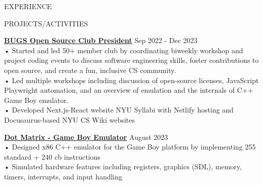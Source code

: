 \documentclass{resume} %
\begin{document}
\begin{rSection}{EXPERIENCE}
\end{rSection} 


\begin{rSection}{PROJECTS/ACTIVITIES}

\textbf{\href{https://bugs-nyu.github.io/}{BUGS Open Source Club President}} \hfill Sep 2022 - Dec 2023 \\
• Started and led 50+ member club by coordinating biweekly workshop and project coding events to discuss software engineering skills, foster contributions to open source, and create a fun, inclusive CS community.\\
• Led multiple workshops including discussion of open-source licenses, JavaScript Playwright automation, and an overview of emulation and the internals of C++ Game Boy emulator.\\
• Developed Next.js-React website NYU Syllabi with Netlify hosting and Docusaurus-based NYU CS Wiki websites


\textbf{\href{https://github.com/aminoa/dot-matrix}{Dot Matrix - Game Boy Emulator}} \hfill August 2023 \\
• Designed x86 C++ emulator for the Game Boy platform by implementing 255 standard + 240 cb instructions \\
• Simulated hardware features including registers, graphics (SDL), memory, timers, interrupts, and input handling 


\end{rSection}
\end{document}
